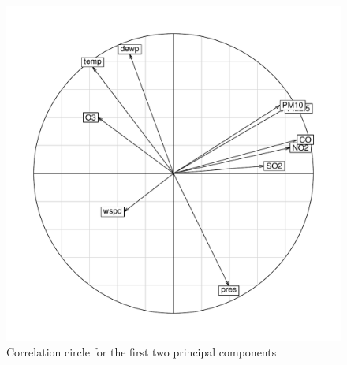 \documentclass[a4paper, 12pt]{article}
\begin{document}
    \begin{figure}[H]
        \centering
        \includegraphics[width=0.6 \textwidth]{resources/pdf/pca_correlation_circle.pdf}
        \caption{Correlation circle for the first two principal components}
        \label{fig:pca_correlation_circle}
    \end{figure}
    
\end{document}
